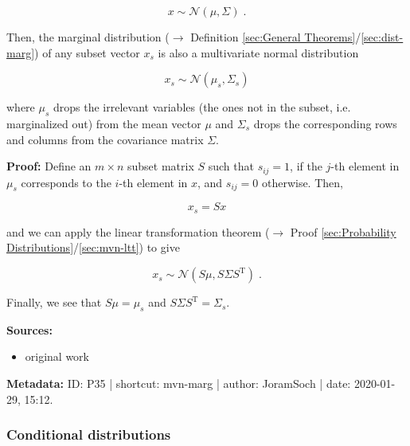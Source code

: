 \documentclass[a4paper,12pt,twoside]{book}
\begin{document}
\begin{equation} \label{eq:mvn-marg-mvn}
x \sim \mathcal{N}(\mu, \Sigma) \; .
\end{equation}

Then, the marginal distribution ($\rightarrow$ Definition \ref{sec:General Theorems}/\ref{sec:dist-marg}) of any subset vector $x_s$ is also a multivariate normal distribution

\begin{equation} \label{eq:mvn-marg-mvn-marg}
x_s \sim \mathcal{N}(\mu_s, \Sigma_s)
\end{equation}

where $\mu_s$ drops the irrelevant variables (the ones not in the subset, i.e. marginalized out) from the mean vector $\mu$ and $\Sigma_s$ drops the corresponding rows and columns from the covariance matrix $\Sigma$.


\vspace{1em}
\textbf{Proof:} Define an $m \times n$ subset matrix $S$ such that $s_{ij} = 1$, if the $j$-th element in $\mu_s$ corresponds to the $i$-th element in $x$, and $s_{ij} = 0$ otherwise. Then,

\begin{equation} \label{eq:mvn-marg-xs}
x_s = S x
\end{equation}

and we can apply the linear transformation theorem ($\rightarrow$ Proof \ref{sec:Probability Distributions}/\ref{sec:mvn-ltt}) to give

\begin{equation} \label{eq:mvn-marg-mvn-marg-qed}
x_s \sim \mathcal{N}(S \mu, S \Sigma S^\mathrm{T}) \; .
\end{equation}

Finally, we see that $S \mu = \mu_s$ and $S \Sigma S^\mathrm{T} = \Sigma_s$.


\vspace{1em}
\textbf{Sources:}
\begin{itemize}
\item original work\end{itemize}


\vspace{1em}
\textbf{Metadata:} ID: P35 | shortcut: mvn-marg | author: JoramSoch | date: 2020-01-29, 15:12.
\vspace{1em}



\subsubsection[\textbf{Conditional distributions}]{Conditional distributions} \label{sec:mvn-cond}
\setcounter{equation}{0}
\end{document}
